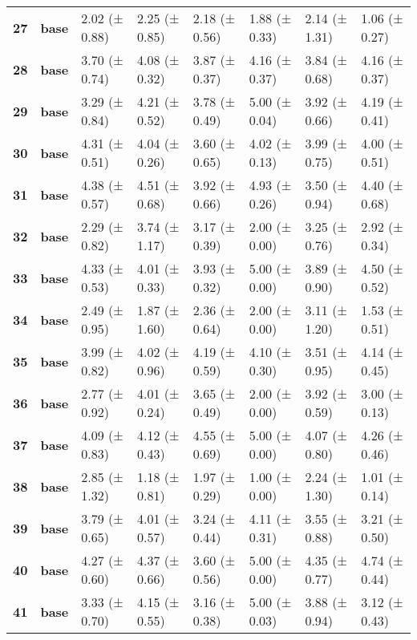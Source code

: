 \begin{longtable}{llllllll}
\cline{1-8}
\textbf{27} & \textbf{base} & 2.02 (± 0.88) & 2.25 (± 0.85) & 2.18 (± 0.56) & 1.88 (± 0.33) & 2.14 (± 1.31) & 1.06 (± 0.27) \\
\cline{1-8}
\textbf{28} & \textbf{base} & 3.70 (± 0.74) & 4.08 (± 0.32) & 3.87 (± 0.37) & 4.16 (± 0.37) & 3.84 (± 0.68) & 4.16 (± 0.37) \\
\cline{1-8}
\textbf{29} & \textbf{base} & 3.29 (± 0.84) & 4.21 (± 0.52) & 3.78 (± 0.49) & 5.00 (± 0.04) & 3.92 (± 0.66) & 4.19 (± 0.41) \\
\cline{1-8}
\textbf{30} & \textbf{base} & 4.31 (± 0.51) & 4.04 (± 0.26) & 3.60 (± 0.65) & 4.02 (± 0.13) & 3.99 (± 0.75) & 4.00 (± 0.51) \\
\cline{1-8}
\textbf{31} & \textbf{base} & 4.38 (± 0.57) & 4.51 (± 0.68) & 3.92 (± 0.66) & 4.93 (± 0.26) & 3.50 (± 0.94) & 4.40 (± 0.68) \\
\cline{1-8}
\textbf{32} & \textbf{base} & 2.29 (± 0.82) & 3.74 (± 1.17) & 3.17 (± 0.39) & 2.00 (± 0.00) & 3.25 (± 0.76) & 2.92 (± 0.34) \\
\cline{1-8}
\textbf{33} & \textbf{base} & 4.33 (± 0.53) & 4.01 (± 0.33) & 3.93 (± 0.32) & 5.00 (± 0.00) & 3.89 (± 0.90) & 4.50 (± 0.52) \\
\cline{1-8}
\textbf{34} & \textbf{base} & 2.49 (± 0.95) & 1.87 (± 1.60) & 2.36 (± 0.64) & 2.00 (± 0.00) & 3.11 (± 1.20) & 1.53 (± 0.51) \\
\cline{1-8}
\textbf{35} & \textbf{base} & 3.99 (± 0.82) & 4.02 (± 0.96) & 4.19 (± 0.59) & 4.10 (± 0.30) & 3.51 (± 0.95) & 4.14 (± 0.45) \\
\cline{1-8}
\textbf{36} & \textbf{base} & 2.77 (± 0.92) & 4.01 (± 0.24) & 3.65 (± 0.49) & 2.00 (± 0.00) & 3.92 (± 0.59) & 3.00 (± 0.13) \\
\cline{1-8}
\textbf{37} & \textbf{base} & 4.09 (± 0.83) & 4.12 (± 0.43) & 4.55 (± 0.69) & 5.00 (± 0.00) & 4.07 (± 0.80) & 4.26 (± 0.46) \\
\cline{1-8}
\textbf{38} & \textbf{base} & 2.85 (± 1.32) & 1.18 (± 0.81) & 1.97 (± 0.29) & 1.00 (± 0.00) & 2.24 (± 1.30) & 1.01 (± 0.14) \\
\cline{1-8}
\textbf{39} & \textbf{base} & 3.79 (± 0.65) & 4.01 (± 0.57) & 3.24 (± 0.44) & 4.11 (± 0.31) & 3.55 (± 0.88) & 3.21 (± 0.50) \\
\cline{1-8}
\textbf{40} & \textbf{base} & 4.27 (± 0.60) & 4.37 (± 0.66) & 3.60 (± 0.56) & 5.00 (± 0.00) & 4.35 (± 0.77) & 4.74 (± 0.44) \\
\cline{1-8}
\textbf{41} & \textbf{base} & 3.33 (± 0.70) & 4.15 (± 0.55) & 3.16 (± 0.38) & 5.00 (± 0.03) & 3.88 (± 0.94) & 3.12 (± 0.43) \\

\end{longtable}
